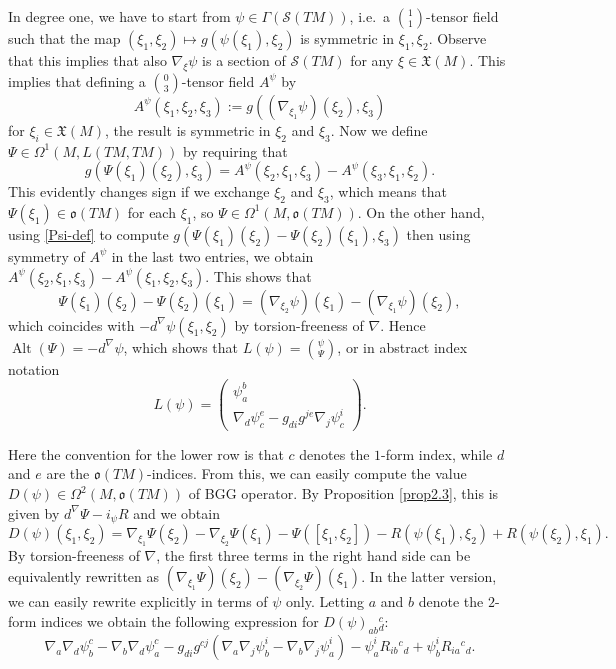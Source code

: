 \documentclass[12pt,a4paper]{amsart}
\def\frak{\mathfrak}
\def\Cal{\mathcal}
\newcommand{\ps}{\psi}
\newcommand{\Ga}{\Gamma}
\newcommand{\Ps}{\Psi}
\newcommand{\Om}{\Omega}
\newcommand{\Alt}{\operatorname{Alt}}
\numberwithin{theorem}{section}
\numberwithin{equation}{section}
\theoremstyle{definition}
\theoremstyle{remark}
\begin{document}
In degree one, we have to start from $\ps\in\Ga(\Cal S(TM))$, i.e.~a
$\binom11$-tensor field such that the map $(\xi_1,\xi_2)\mapsto g(\psi(\xi_1),\xi_2)$
is symmetric in $\xi_1,\xi_2$. Observe that this implies that also $\nabla_\xi\ps$ is
a section of $\Cal S(TM)$ for any $\xi\in\frak X(M)$. This implies that defining a
$\binom03$-tensor field $A^\psi$ by 
\begin{equation}\label{Apsi-def}
A^\psi (\xi_1,\xi_2,\xi_3):=g((\nabla_{\xi_1}\ps)(\xi_2),\xi_3)
\end{equation}
for $\xi_i\in\frak X(M)$, the result is symmetric in $\xi_2$ and $\xi_3$. Now we
define $\Ps\in\Om^1(M,L(TM,TM))$ by requiring that
\begin{equation}\label{Psi-def}
g(\Ps(\xi_1)(\xi_2),\xi_3)=A^\psi(\xi_2,\xi_1,\xi_3)-A^\psi(\xi_3,\xi_1,\xi_2).
\end{equation}
This evidently changes sign if we exchange $\xi_2$ and $\xi_3$, which means that
$\Psi(\xi_1)\in\frak o(TM)$ for each $\xi_1$, so $\Psi\in\Om^1(M,\frak o(TM))$. On
the other hand, using \eqref{Psi-def} to compute
$g(\Ps(\xi_1)(\xi_2)-\Ps(\xi_2)(\xi_1),\xi_3)$ then using symmetry of $A^\psi$ in the last
two entries, we obtain $A^\psi(\xi_2,\xi_1,\xi_3)-A^\psi(\xi_1,\xi_2,\xi_3)$. This
shows that 
$$
\Ps(\xi_1)(\xi_2)-\Ps(\xi_2)(\xi_1)=(\nabla_{\xi_2}\psi)(\xi_1)-(\nabla_{\xi_1}\psi)(\xi_2),
$$
which coincides with $-d^\nabla\ps(\xi_1,\xi_2)$ by torsion-freeness of
$\nabla$. Hence $\Alt(\Psi)=-d^{\nabla}\psi$, which shows that
$L(\psi)=\binom{\psi}{\Psi}$, or in abstract index notation
$$
L(\psi)=\begin{pmatrix} \psi_a^b \\ \nabla_d\psi_c^e-g_{di}g^{je}\nabla_j\psi_c^i\end{pmatrix}. 
$$

Here the convention for the lower row is that $c$ denotes the $1$-form index, while
$d$ and $e$ are the $\frak o(TM)$-indices.  From this, we can easily compute the
value $D(\psi)\in\Om^2(M,\frak o(TM))$ of BGG operator. By Proposition \ref{prop2.3},
this is given by $d^{\nabla}\Psi-i_{\ps}R$ and we obtain
$$
D(\psi)(\xi_1,\xi_2)=\nabla_{\xi_1}\Psi(\xi_2)-\nabla_{\xi_2}\Psi(\xi_1)-\Psi([\xi_1,\xi_2])-R(\psi(\xi_1),\xi_2)+R(\psi(\xi_2),\xi_1). 
$$
By torsion-freeness of $\nabla$, the first three terms in the right hand side can be
equivalently rewritten as
$(\nabla_{\xi_1}\Psi)(\xi_2)-(\nabla_{\xi_2}\Psi)(\xi_1)$. In the latter version, we
can easily rewrite explicitly in terms of $\psi$ only. Letting $a$ and $b$ denote the
$2$-form indices we obtain the following expression for $D(\psi)_{ab}{}^c_d$:
$$
\nabla_a\nabla_d\psi_b^c-\nabla_b\nabla_d\psi_a^c
-g_{di}g^{cj}(\nabla_a\nabla_j\psi^i_b-\nabla_b\nabla_j\psi^i_a)
-\psi^i_aR_{ib}{}^c{}_d+\psi^i_bR_{ia}{}^c{}_d.
$$
\end{document}
